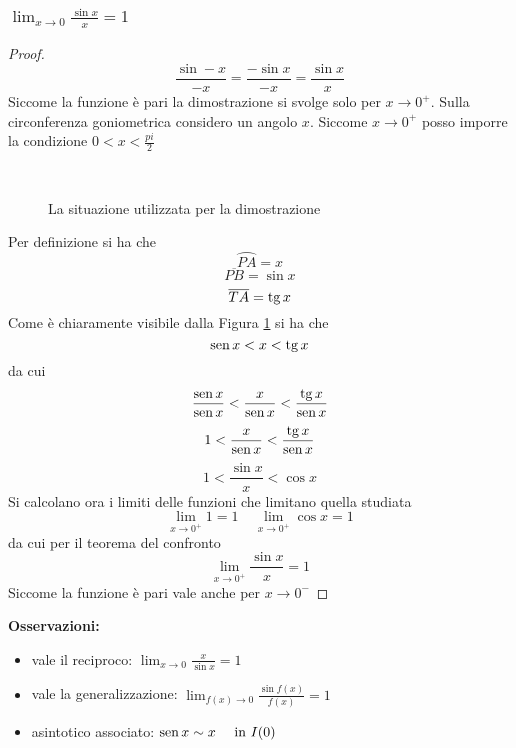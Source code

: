 \documentclass{book}     %
\begin{document}
\subsubsection{$\lim_{x\to 0}\frac{\sin x}{x}=1$}
\begin{proof}
    \[\frac{\sin -x}{-x}=\frac{-\sin x}{-x}=\frac{\sin x}{x}\]
    Siccome la funzione è pari la dimostrazione si svolge solo per $x\to 0^+$. Sulla circonferenza goniometrica considero un angolo $x$. Siccome $x \to 0^+$ posso imporre la condizione $0<x<\frac{pi}{2}$\\
    \begin{figure}[h]
        \centering
            \\
        \caption{La situazione utilizzata per la dimostrazione}
        \label{fig:sinx}
    \end{figure}
    Per definizione si ha che \[\wideparen{PA}=x\]\[\overline{PB}=\sin x\] \[\overline{TA}=\tg x\] 
    Come è chiaramente visibile dalla Figura \ref{fig:sinx} si ha che \[\sin x < x < \tg x\] da cui \[\frac{\sin x}{\sin x}<\frac{ x}{\sin x}<\frac{\tg x}{\sin x}\] \[1<\frac{ x}{\sin x}<\frac{\tg x}{\sin x}\] \[1<\frac{\sin x}{x}<\cos x\]
    Si calcolano ora i limiti delle funzioni che limitano quella studiata
    \[\lim_{x \to 0^+}1=1 ~~~~~ \lim_{x \to 0^+}\cos x=1\]
    da cui per il teorema del confronto \[\lim_{x\to 0^+} \frac{\sin x}{x}=1\] Siccome la funzione è pari vale anche per $x\to0^-$
\end{proof}
\textbf{Osservazioni:}
\begin{itemize}
    \item vale il reciproco: $\lim_{x\to 0}\frac{x}{\sin x}=1$
    \item vale la generalizzazione: $\lim_{f(x)\to 0}\frac{\sin f(x)}{f(x)}=1$
    \item asintotico associato: $\sin x \sim x ~~~~\textnormal{in } I(0)$
\end{itemize}
\end{document}
